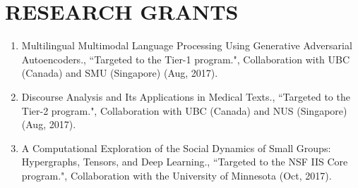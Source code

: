\documentclass[paper=letter,fontsize=11pt]{scrartcl} %
\newcommand{\NewPart}[2]{\section*{\uppercase{#1} #2}}
\newcommand{\FundingEntry}[5]{
        \noindent #1, ``#2", #3 (#4#5).}
\begin{document}
\NewPart{Research Grants}{}

\begin{enumerate}
\item \FundingEntry{Multilingual Multimodal Language Processing Using Generative Adversarial Autoencoders.} {Targeted to the Tier-1 program.} {Collaboration with UBC (Canada) and SMU (Singapore)}{Aug, 2017}
{}

\item \FundingEntry{Discourse Analysis and Its Applications in Medical Texts.} {Targeted to the Tier-2 program.} {Collaboration with UBC (Canada) and NUS (Singapore)}{Aug, 2017}
{}

\item \FundingEntry{A Computational Exploration of the Social Dynamics of Small Groups: Hypergraphs, Tensors, and Deep Learning.} {Targeted to the NSF IIS Core program.} {Collaboration with the University of Minnesota}{Oct, 2017}
{}
\end{enumerate}
\end{document}
